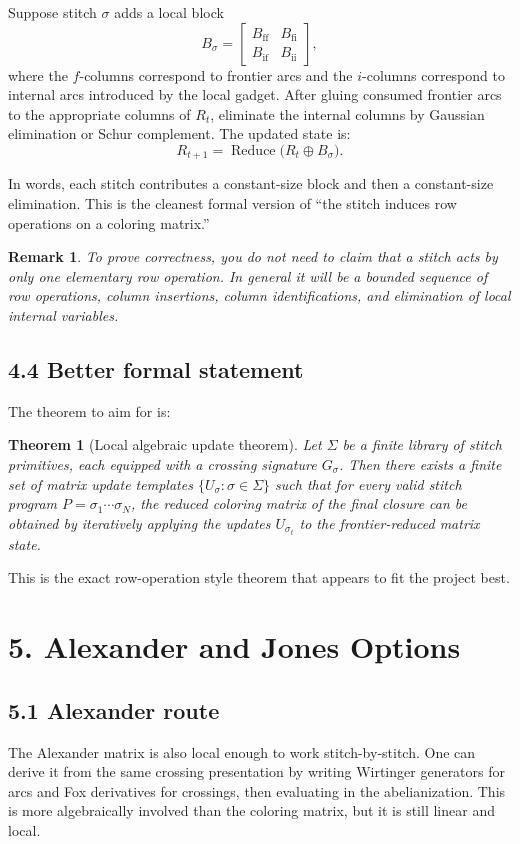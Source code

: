 \documentclass[11pt]{article}
\newtheorem{theorem}{Theorem}
\newtheorem{remark}{Remark}
\begin{document}
Suppose stitch \(\sigma\) adds a local block
\[
B_\sigma=
\begin{bmatrix}
B_{\mathrm{ff}} & B_{\mathrm{fi}} \\
B_{\mathrm{if}} & B_{\mathrm{ii}}
\end{bmatrix},
\]
where the \(f\)-columns correspond to frontier arcs and the \(i\)-columns correspond to internal arcs introduced by the local gadget. After gluing consumed frontier arcs to the appropriate columns of \(R_t\), eliminate the internal columns by Gaussian elimination or Schur complement. The updated state is:
\[
R_{t+1} = \operatorname{Reduce}\!\bigl(R_t \oplus B_\sigma\bigr).
\]

In words, each stitch contributes a constant-size block and then a constant-size elimination. This is the cleanest formal version of ``the stitch induces row operations on a coloring matrix.''

\begin{remark}
To prove correctness, you do \emph{not} need to claim that a stitch acts by only one elementary row operation. In general it will be a bounded sequence of row operations, column insertions, column identifications, and elimination of local internal variables.
\end{remark}

\subsection*{4.4 Better formal statement}
The theorem to aim for is:

\begin{theorem}[Local algebraic update theorem]
Let \(\Sigma\) be a finite library of stitch primitives, each equipped with a crossing signature \(G_\sigma\). Then there exists a finite set of matrix update templates \(\{U_\sigma : \sigma\in\Sigma\}\) such that for every valid stitch program \(P=\sigma_1\cdots\sigma_N\), the reduced coloring matrix of the final closure can be obtained by iteratively applying the updates \(U_{\sigma_t}\) to the frontier-reduced matrix state.
\end{theorem}

This is the exact row-operation style theorem that appears to fit the project best.

\section*{5. Alexander and Jones Options}

\subsection*{5.1 Alexander route}
The Alexander matrix is also local enough to work stitch-by-stitch. One can derive it from the same crossing presentation by writing Wirtinger generators for arcs and Fox derivatives for crossings, then evaluating in the abelianization. This is more algebraically involved than the coloring matrix, but it is still linear and local.
\end{document}
